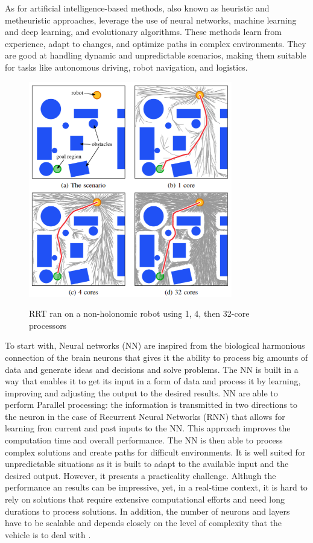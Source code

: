 As for artificial intelligence-based methods, also known as heuristic and metheuristic approaches, 
leverage the use of neural networks, machine learning and deep learning, and evolutionary algorithms. 
These methods learn from experience, adapt to changes, and optimize paths in complex environments. 
They are good at handling dynamic and unpredictable scenarios, making them suitable for tasks like 
autonomous driving, robot navigation, and logistics. 


\begin{figure}[H]
    \begin{center}
       \includegraphics[width=3.5in]{images/Chap1/sampling-based.png}\\
       \caption{RRT ran on a non-holonomic robot using 1, 4, then 32-core 
       processors \cite{R16}}
       \label{sampling-based}
       \end{center}
\end{figure}

To start with, Neural networks (NN) are inspired from the biological harmonious connection of the brain neurons
that gives it the ability to process big amounts of data and generate ideas and decisions and solve problems. 
The NN is built in a way that enables it to get its input in a form of data and process it by learning, improving 
and adjusting the output to the desired results. NN are able to perform Parallel processing: the information is 
transmitted in two
directions to the neuron in the case of Recurrent Neural Networks (RNN) that allows for learning fron current and 
past inputs to the NN. This approach improves the computation time and overall performance. 
The NN is then able to process complex solutions and create paths for difficult environments. 
It is well suited for unpredictable situations as it is built to adapt to the available input and the desired output.
However, it presents a practicality challenge. Althugh the performance an results can be impressive, yet, in a 
real-time context, 
it is hard to rely on solutions that require extensive computational efforts and need long durations to 
process solutions. In addition, the number of neurons and layers have to be scalable and depends closely on the 
level of complexity that the vehicle is to deal with \cite{R12}. 

